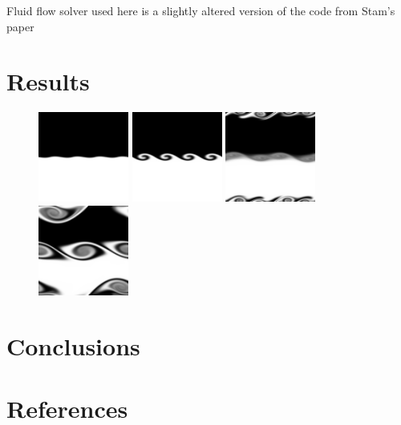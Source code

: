 \documentclass[12pt, letterpaper]{article}
\begin{document}
Fluid flow solver used here is a slightly altered version of the code from Stam's paper %


\section{Results}
\begin{figure}[h!]
  \center
  \includegraphics[width=8em]{run/images/10_steps.png}
  \includegraphics[width=8em]{run/images/100_steps.png}
  \includegraphics[width=8em]{run/images/300_steps.png}
  \includegraphics[width=8em]{run/images/500_steps.png}
  \caption{}
\end{figure}

\section{Conclusions}

\section{References}
\end{document}

